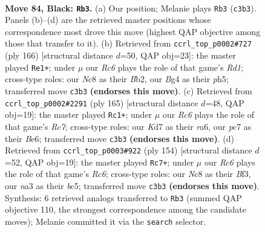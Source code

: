 \documentclass[11pt]{article}
\begin{document}
\clearpage

\begin{figure}[p]\centering
\begin{subfigure}{0.46\textwidth}\centering
\resizebox{\linewidth}{!}{%
\newchessgame
\chessboard[
  setfen={2n4K/2Pk4/p7/P4p1p/4pBb1/N1r3P1/8/R7 b - - 75 84},
  showmover=false,
  pgfstyle=straightmove, color=movearrow, markmove={c3-b3}
]}
\caption{}
\end{subfigure}\hfill
\begin{subfigure}{0.46\textwidth}\centering
\resizebox{\linewidth}{!}{%
\newchessgame
\chessboard[
  setfen={r7/8/3bk1p1/7p/1p5P/1K4P1/1BP2P2/3R4 w - - 29 84},
  showmover=false,
  pgfstyle=straightmove, color=movearrow, markmove={d1-e1}
]}
\caption{}
\end{subfigure}
\\[4pt]
\begin{subfigure}{0.46\textwidth}\centering
\resizebox{\linewidth}{!}{%
\newchessgame
\chessboard[
  setfen={8/5k2/R3bp2/6p1/2pB3p/2P2P1P/2r3P1/7K b - - 39 83},
  showmover=false,
  pgfstyle=straightmove, color=movearrow, markmove={c2-c1}
]}
\caption{}
\end{subfigure}\hfill
\begin{subfigure}{0.46\textwidth}\centering
\resizebox{\linewidth}{!}{%
\newchessgame
\chessboard[
  setfen={8/5k1p/1pR4P/p1b1p1p1/P1P1P1K1/1r3B2/8/8 w - - 5 78},
  showmover=false,
  pgfstyle=straightmove, color=movearrow, markmove={c6-c7}
]}
\caption{}
\end{subfigure}
\caption{\textbf{Move 84, Black: \texttt{Rb3}.} (a) Our position; Melanie plays \texttt{Rb3} (\texttt{c3b3}). Panels (b)--(d) are the retrieved master positions whose correspondence most drove this move (highest QAP objective among those that transfer to it). (b) Retrieved from \texttt{ccrl\_top\_p0002\#727} (ply 166) [structural distance $d$=50, QAP obj=23]: the master played \texttt{Re1+}; under $\mu$ our \emph{Rc6} plays the role of that game's \emph{Rd1}; cross-type roles: our \emph{N}c8 as their \emph{B}b2, our \emph{B}g4 as their \emph{p}h5; transferred move \texttt{c3b3} \textbf{(endorses this move)}. (c) Retrieved from \texttt{ccrl\_top\_p0002\#2291} (ply 165) [structural distance $d$=48, QAP obj=19]: the master played \texttt{Rc1+}; under $\mu$ our \emph{Rc6} plays the role of that game's \emph{Rc7}; cross-type roles: our \emph{K}d7 as their \emph{r}a6, our \emph{p}c7 as their \emph{B}e6; transferred move \texttt{c3b3} \textbf{(endorses this move)}. (d) Retrieved from \texttt{ccrl\_top\_p0003\#922} (ply 154) [structural distance $d$=52, QAP obj=19]: the master played \texttt{Rc7+}; under $\mu$ our \emph{Rc6} plays the role of that game's \emph{Rc6}; cross-type roles: our \emph{N}c8 as their \emph{B}f3, our \emph{n}a3 as their \emph{b}c5; transferred move \texttt{c3b3} \textbf{(endorses this move)}. Synthesis: 6 retrieved analogs transferred to \texttt{Rb3} (summed QAP objective 110, the strongest correspondence among the candidate moves); Melanie committed it via the \texttt{search} selector.}
\label{fig:thought-m167}
\end{figure}
\end{document}
